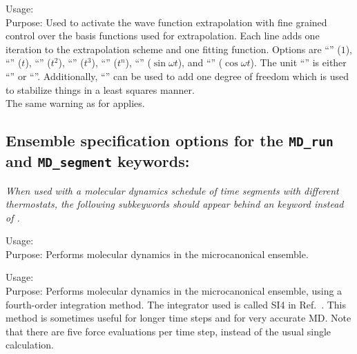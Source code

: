 {\noindent
  Usage:   \\[1.0em]
  Purpose: Used to activate the wave function extrapolation with fine grained
  control over the basis functions used for extrapolation.  Each
   line adds one iteration to the extrapolation scheme and
  one fitting function.  Options are ``'' ($1$),
  ``'' ($t$), ``'' ($t^2$),
  ``'' ($t^3$), ``'' ($t^n$),
  ``'' ($\sin\omega t$), and ``'' ($\cos\omega t$).  The unit ``'' is either
  ``'' or ``''.  Additionally, ``''
  can be used to add one degree of freedom which is used to stabilize things
  in a least squares manner.
  \\[1.0em]
}
The same warning as for  applies.


\newpage

\subsection*{Ensemble specification options for the \texttt{MD\_run} and
  \texttt{MD\_segment} keywords:} 

\emph{When used with a molecular dynamics schedule of time segments with
  different thermostats, the following subkeywords should appear behind an
   keyword instead of .}

{\noindent
  Usage:    \\[1.0ex]
  Purpose: Performs molecular dynamics in the microcanonical
    ensemble. \\[1.0ex]
}

{\noindent
  Usage:    \\[1.0ex]
  Purpose: Performs molecular dynamics in the microcanonical
    ensemble, using a fourth-order integration method. The integrator used is 
    called SI4 in Ref.~\cite{Ishida98}. This method is sometimes useful for 
    longer time steps and for very accurate MD. Note that there are five 
    force evaluations per time step, instead of the usual single calculation.\\[1.0ex]
}

